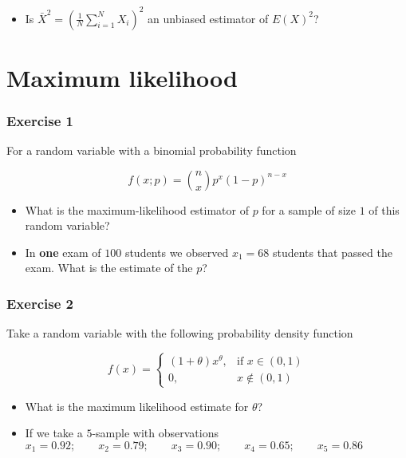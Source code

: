\documentclass[
]{book}
\providecommand{\tightlist}{%
  \setlength{\itemsep}{0pt}\setlength{\parskip}{0pt}}
\begin{document}
\begin{itemize}
\tightlist
\item
  Is \(\bar{X}^2=(\frac{1}{N}\sum_{i=1}^N X_i)^2\) an unbiased estimator of \(E(X)^2\)?
\end{itemize}

\hypertarget{maximum-likelihood-7}{%
\section{Maximum likelihood}\label{maximum-likelihood-7}}

\hypertarget{exercise-1-7}{%
\subsubsection{Exercise 1}\label{exercise-1-7}}

For a random variable with a binomial probability function

\[f(x; p)=\binom n x p^x(1-p)^{n-x}\]

\begin{itemize}
\item
  What is the maximum-likelihood estimator of \(p\) for a sample of size \(1\) of this random variable?
\item
  In \textbf{one} exam of \(100\) students we observed \(x_1=68\) students that passed the exam. What is the estimate of the \(p\)?
\end{itemize}

\hypertarget{exercise-2-7}{%
\subsubsection{Exercise 2}\label{exercise-2-7}}

Take a random variable with the following probability density function

\[
f(x)=
\begin{cases}
    (1+\theta)x^\theta,& \text{if } x\in (0,1)\\
    0,&  x\notin (0,1)
\end{cases}
\]

\begin{itemize}
\item
  What is the maximum likelihood estimate for \(\theta\)?
\item
  If we take a \(5\)-sample with observations
  \(x_1 = 0.92; \qquad x_2 = 0.79; \qquad x_3 = 0.90; \qquad x_4 = 0.65; \qquad x_5 = 0.86\)
\end{itemize}
\end{document}
